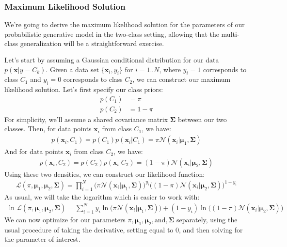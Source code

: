 \subsubsection{Maximum Likelihood Solution}
We're going to derive the maximum likelihood solution for the parameters of our probabilistic generative model in the two-class setting, allowing that the multi-class generalization will be a straightforward exercise.

Let's start by assuming a Gaussian conditional distribution for our data $p(\textbf{x} | y = C_{k})$. Given a data set \{$\textbf{x}_{i}, y_{i}$\} for $i = 1..N$, where $y_{i} = 1$ corresponds to class $C_{1}$ and $y_{i} = 0$ corresponds to class $C_{2}$, we can construct our maximum likelihood solution. Let's first specify our class priors:
\begin{align*}
	p(C_{1}) &= \pi \\
	p(C_{2}) &= 1 - \pi
\end{align*}
For simplicity, we'll assume a shared covariance matrix $\boldsymbol{\Sigma}$ between our two classes. Then, for data points $\textbf{x}_{i}$ from class $C_{1}$, we have:
\begin{align*}
	p(\textbf{x}_{i}, C_{1}) = p(C_{1})p(\textbf{x}_{i}|C_{1}) = \pi\mathcal{N}(\textbf{x}_{i} | \boldsymbol{\mu}_{1}, \boldsymbol{\Sigma})
\end{align*}
And for data points $\textbf{x}_{i}$ from class $C_{2}$, we have:
\begin{align*}
	p(\textbf{x}_{i}, C_{2}) = p(C_{2})p(\textbf{x}_{i}|C_{2}) = (1-\pi)\mathcal{N}(\textbf{x}_{i} | \boldsymbol{\mu}_{2}, \boldsymbol{\Sigma})
\end{align*}
Using these two densities, we can construct our likelihood function:
\begin{align*}
	\mathcal{L}(\pi, \boldsymbol{\mu}_{1}, \boldsymbol{\mu}_{2}, \boldsymbol{\Sigma}) = \prod_{i=1}^{N} \bigg( \pi\mathcal{N}(\textbf{x}_{i} | \boldsymbol{\mu}_{1}, \boldsymbol{\Sigma}) \bigg)^{y_{i}} \bigg( (1-\pi)\mathcal{N}(\textbf{x}_{i} | \boldsymbol{\mu}_{2}, \boldsymbol{\Sigma}) \bigg)^{1 - y_{i}}
\end{align*}
As usual, we will take the logarithm which is easier to work with:
\begin{align*}
	\ln \mathcal{L}(\pi, \boldsymbol{\mu}_{1}, \boldsymbol{\mu}_{2}, \boldsymbol{\Sigma}) = \sum_{i=1}^{N} y_{i} \ln \bigg( \pi\mathcal{N}(\textbf{x}_{i} | \boldsymbol{\mu}_{1}, \boldsymbol{\Sigma}) \bigg) + (1 - y_{i}) \ln \bigg( (1-\pi)\mathcal{N}(\textbf{x}_{i} | \boldsymbol{\mu}_{2}, \boldsymbol{\Sigma}) \bigg)
\end{align*}
We can now optimize for our parameters $\pi, \boldsymbol{\mu}_{1}, \boldsymbol{\mu}_{2}, \text{and}, \boldsymbol{\Sigma}$ separately, using the usual procedure of taking the derivative, setting equal to 0, and then solving for the parameter of interest.

